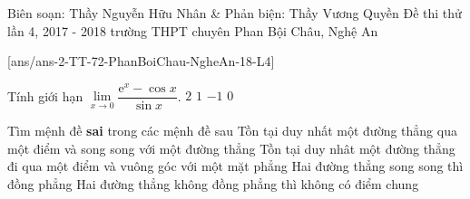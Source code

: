 \begin{name}
{Biên soạn: Thầy Nguyễn Hữu Nhân \& Phản biện: Thầy Vương Quyền}
{Đề thi thử lần 4, 2017 - 2018 trường THPT chuyên Phan Bội Châu, Nghệ An}
\end{name}
\setcounter{ex}{0}\setcounter{bt}{0}
[ans/ans-2-TT-72-PhanBoiChau-NgheAn-18-L4]

\begin{ex}%
	Tính giới hạn $\lim\limits_{x \rightarrow 0} \dfrac{\mathrm{e}^x - \cos x}{\sin x}$.
	\choice
	{$2$}
	{\True $1$}
	{$-1$}
	{$0$}
\end{ex}

\begin{ex}%
	Tìm mệnh đề \textbf{sai} trong các mệnh đề sau
	\choice
	{\True Tồn tại duy nhất một đường thẳng qua một điểm và song song với một đường thẳng}
	{Tồn tại duy nhât một đường thẳng đi qua một điểm và vuông góc với một mặt phẳng}
	{Hai đường thẳng song song thì đồng phẳng}
	{Hai đường thẳng không đồng phẳng thì không có điểm chung}
\end{ex}

